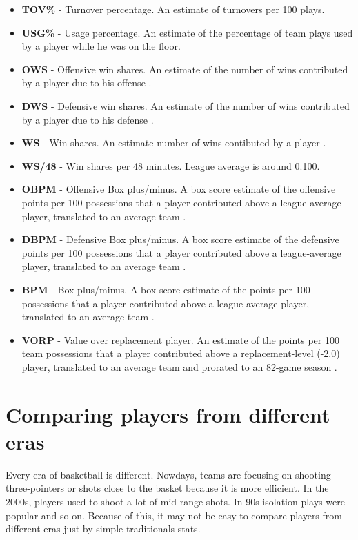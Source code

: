 \documentclass[a4paper]{article}
\begin{document}
\begin{itemize}
	\item \textbf{TOV\%} - Turnover percentage. An estimate of turnovers per 100 plays. 
	\item \textbf{USG\%} - Usage percentage. An estimate of the percentage of team plays used by a player while he was on the floor.  
	\item \textbf{OWS} - Offensive win shares. An estimate of the number of wins contributed by a player due to his offense \cite{ws}. 
	\item \textbf{DWS} - Defensive win shares. An estimate of the number of wins contributed by a player due to his defense \cite{ws}. 
	\item \textbf{WS} - Win shares. An estimate number of wins contibuted by a player \cite{ws}.
	\item \textbf{WS/48} - Win shares per 48 minutes. League average is around 0.100.
	\item \textbf{OBPM} - Offensive Box plus/minus. A box score estimate of the offensive points per 100 possessions that a player contributed above a league-average player, translated to an average team \cite{bpm}.
	\item \textbf{DBPM} - Defensive Box plus/minus. A box score estimate of the defensive points per 100 possessions that a player contributed above a league-average player, translated to an average team \cite{bpm}.
	\item \textbf{BPM} - Box plus/minus. A box score estimate of the points per 100 possessions that a player contributed above a league-average player, translated to an average team \cite{bpm}.
	\item \textbf{VORP} - Value over replacement player. An estimate of the points per 100 team possessions that a player contributed above a replacement-level (-2.0) player, translated to an average team and prorated to an 82-game season \cite{bpm}.

\end{itemize}

\section{Comparing players from different eras}
\label{sec:diff_eras}

Every era of basketball is different. Nowdays, teams are focusing on shooting three-pointers or shots close to the basket because it is more efficient. In the 2000s, players used to shoot a lot of mid-range shots. In 90s isolation plays were popular and so on. Because of this, it may not be easy to compare players from different eras just by simple traditionals stats.
\end{document}
